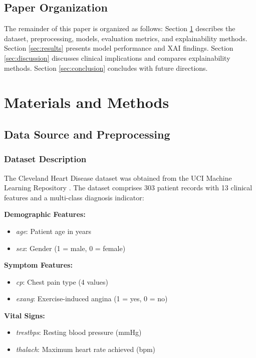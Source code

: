 \documentclass[journal]{IEEEtran}
\begin{document}
\subsection{Paper Organization}

The remainder of this paper is organized as follows: Section \ref{sec:methods} describes the dataset, preprocessing, models, evaluation metrics, and explainability methods. Section \ref{sec:results} presents model performance and XAI findings. Section \ref{sec:discussion} discusses clinical implications and compares explainability methods. Section \ref{sec:conclusion} concludes with future directions.

\section{Materials and Methods}\label{sec:methods}

\subsection{Data Source and Preprocessing}

\subsubsection{Dataset Description}
The Cleveland Heart Disease dataset was obtained from the UCI Machine Learning Repository \cite{uci_heart_disease}. The dataset comprises 303 patient records with 13 clinical features and a multi-class diagnosis indicator:

\textbf{Demographic Features:}
\begin{itemize}
    \item \textit{age}: Patient age in years
    \item \textit{sex}: Gender (1 = male, 0 = female)
\end{itemize}

\textbf{Symptom Features:}
\begin{itemize}
    \item \textit{cp}: Chest pain type (4 values)
    \item \textit{exang}: Exercise-induced angina (1 = yes, 0 = no)
\end{itemize}

\textbf{Vital Signs:}
\begin{itemize}
    \item \textit{trestbps}: Resting blood pressure (mmHg)
    \item \textit{thalach}: Maximum heart rate achieved (bpm)
\end{itemize}
\end{document}
